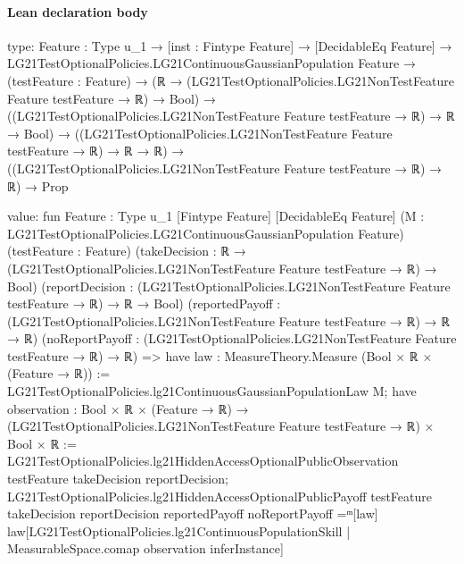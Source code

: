 \documentclass[10pt]{article}
\begin{document}
\paragraph{Lean declaration body}
\begin{ReviewVerbatim}
type:
{Feature : Type u_1} →
  [inst : Fintype Feature] →
    [DecidableEq Feature] →
      LG21TestOptionalPolicies.LG21ContinuousGaussianPopulation Feature →
        (testFeature : Feature) →
          (ℝ → (LG21TestOptionalPolicies.LG21NonTestFeature Feature testFeature → ℝ) → Bool) →
            ((LG21TestOptionalPolicies.LG21NonTestFeature Feature testFeature → ℝ) → ℝ → Bool) →
              ((LG21TestOptionalPolicies.LG21NonTestFeature Feature testFeature → ℝ) → ℝ → ℝ) →
                ((LG21TestOptionalPolicies.LG21NonTestFeature Feature testFeature → ℝ) → ℝ) → Prop

value:
fun {Feature : Type u_1} [Fintype Feature] [DecidableEq Feature]
    (M : LG21TestOptionalPolicies.LG21ContinuousGaussianPopulation Feature) (testFeature : Feature)
    (takeDecision : ℝ → (LG21TestOptionalPolicies.LG21NonTestFeature Feature testFeature → ℝ) → Bool)
    (reportDecision : (LG21TestOptionalPolicies.LG21NonTestFeature Feature testFeature → ℝ) → ℝ → Bool)
    (reportedPayoff : (LG21TestOptionalPolicies.LG21NonTestFeature Feature testFeature → ℝ) → ℝ → ℝ)
    (noReportPayoff : (LG21TestOptionalPolicies.LG21NonTestFeature Feature testFeature → ℝ) → ℝ) =>
  have law : MeasureTheory.Measure (Bool × ℝ × (Feature → ℝ)) :=
    LG21TestOptionalPolicies.lg21ContinuousGaussianPopulationLaw M;
  have observation :
    Bool × ℝ × (Feature → ℝ) → (LG21TestOptionalPolicies.LG21NonTestFeature Feature testFeature → ℝ) × Bool × ℝ :=
    LG21TestOptionalPolicies.lg21HiddenAccessOptionalPublicObservation testFeature takeDecision reportDecision;
  LG21TestOptionalPolicies.lg21HiddenAccessOptionalPublicPayoff testFeature takeDecision reportDecision reportedPayoff
      noReportPayoff =ᵐ[law]
    law[LG21TestOptionalPolicies.lg21ContinuousPopulationSkill | MeasurableSpace.comap observation inferInstance]
\end{ReviewVerbatim}
\end{document}
